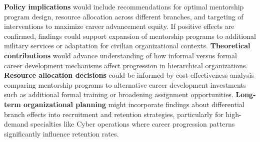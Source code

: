 \documentclass[main.tex]{subfiles}
\begin{document}
\textbf{Policy implications} would include recommendations for optimal mentorship program design, resource allocation across different branches, and targeting of interventions to maximize career advancement equity\parencite{career_pathways_meta}. If positive effects are confirmed, findings could support expansion of mentorship programs to additional military services or adaptation for civilian organizational contexts. \textbf{Theoretical contributions} would advance understanding of how informal versus formal career development mechanisms affect progression in hierarchical organizations. \textbf{Resource allocation decisions} could be informed by cost-effectiveness analysis comparing mentorship programs to alternative career development investments such as additional formal training or broadening assignment opportunities. \textbf{Long-term organizational planning} might incorporate findings about differential branch effects into recruitment and retention strategies, particularly for high-demand specialties like Cyber operations where career progression patterns significantly influence retention rates.

\end{document}

